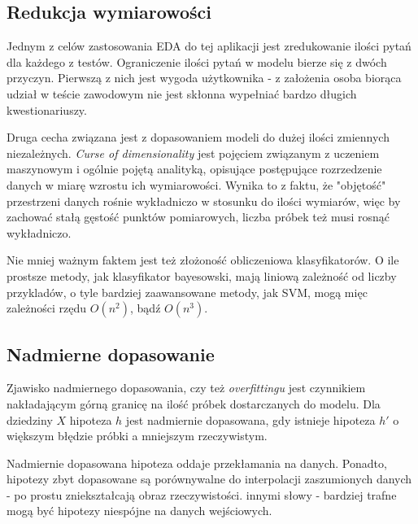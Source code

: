 \documentclass[12pt,a4paper,oneside]{report} %
\begin{document}
\subsection{Redukcja wymiarowości}

Jednym z celów zastosowania EDA do tej aplikacji jest zredukowanie ilości pytań dla każdego z testów. Ograniczenie ilości pytań w modelu bierze się z dwóch przyczyn. Pierwszą z nich jest wygoda użytkownika - z założenia osoba biorąca udział w teście zawodowym nie jest skłonna wypełniać bardzo długich kwestionariuszy.\par

Druga cecha związana jest z dopasowaniem modeli do dużej ilości zmiennych niezależnych. \emph{Curse of dimensionality} jest pojęciem związanym z uczeniem maszynowym i ogólnie pojętą analityką, opisujące postępujące rozrzedzenie danych w miarę wzrostu ich wymiarowości. Wynika to z faktu, że "objętość" przestrzeni danych rośnie wykładniczo w stosunku do ilości wymiarów, więc by zachować stałą gęstość punktów pomiarowych, liczba próbek też musi rosnąć wykładniczo. \cite{curseofdimensionality} \par

Nie mniej ważnym faktem jest też złożoność obliczeniowa klasyfikatorów. O ile prostsze metody, jak klasyfikator bayesowski, mają liniową zależność od liczby przykladów, o tyle bardziej zaawansowane metody, jak SVM, mogą mięc zależności rzędu $O(n^2)$, bądź $O(n^3)$. \par


\subsection{Nadmierne dopasowanie}

Zjawisko nadmiernego dopasowania, czy też \emph{overfittingu} jest czynnikiem nakładającym górną granicę na ilość próbek dostarczanych do modelu. Dla dziedziny $X$ hipoteza $h$ jest nadmiernie dopasowana, gdy istnieje hipoteza $h'$ o większym błędzie próbki a mniejszym rzeczywistym. \cite{cichosz} \par

Nadmiernie dopasowana hipoteza oddaje przekłamania na danych. Ponadto, hipotezy zbyt dopasowane są porównywalne do interpolacji zaszumionych danych - po prostu zniekształcają obraz rzeczywistości. innymi słowy - bardziej trafne mogą być hipotezy niespójne na danych wejściowych.\par
\end{document}

